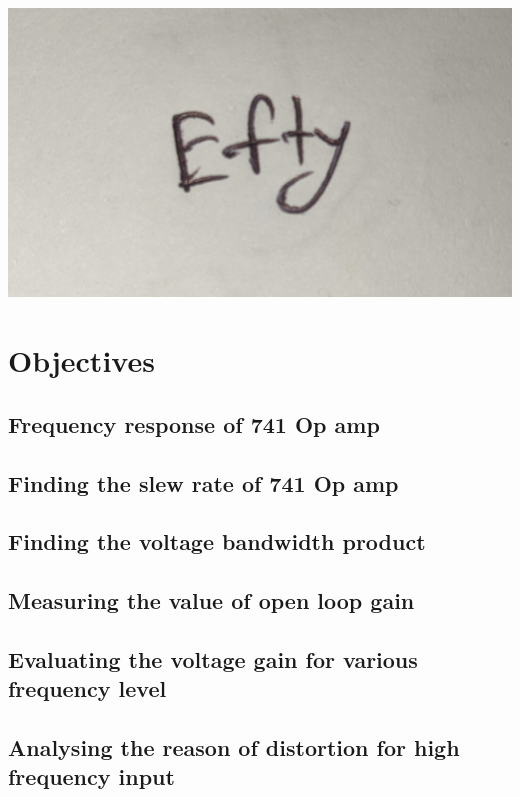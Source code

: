 \documentclass[12pt]{article}
\begin{document}
\includegraphics[scale=.09]{ifty_latex.jpg}\\
\pagebreak
\section{Objectives}
\subsection{Frequency response of 741 Op amp}
\subsection{Finding the slew rate of 741 Op amp}
\subsection{Finding the voltage bandwidth product}
\subsection{Measuring the value of open loop gain}
\subsection{Evaluating the voltage gain for various frequency level}
\subsection{Analysing the reason of distortion for high frequency input}\\
[2cm]
\end{document}
